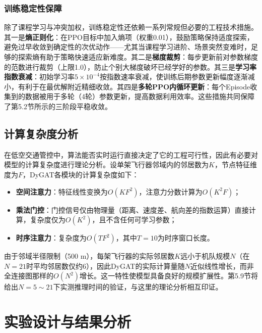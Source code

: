 \documentclass[12pt,a4paper,UTF8]{ctexart}
\begin{document}
\subsubsection{训练稳定性保障}

除了课程学习与冲突加权，训练稳定性还依赖一系列常规但必要的工程技术措施。其一是\textbf{熵正则化}：在PPO目标中加入熵项（权重0.01），鼓励策略保持适度探索，避免过早收敛到确定性的次优动作——尤其当课程学习进阶、场景突然变难时，足够的探索熵有助于策略快速适应新难度。其二是\textbf{梯度裁剪}：每步更新前对参数梯度的范数进行裁剪（上限1.0），防止个别大梯度破坏已经学好的参数。其三是\textbf{学习率指数衰减}：初始学习率$5\times10^{-4}$按指数速率衰减，使训练后期参数更新幅度逐渐减小，有利于在最优解附近精细收敛。其四是\textbf{多轮PPO内循环更新}：每个Episode收集到的数据被用于多轮（4轮）参数更新，提高数据利用效率。这些措施共同保障了第5.2节所示的三阶段平稳收敛。

\subsection{计算复杂度分析}

在低空交通管控中，算法能否实时运行直接决定了它的工程可行性，因此有必要对模型的计算复杂度进行理论分析。设单架飞行器邻域内的邻居数为$K$，节点特征维度为$F$，DyGAT各模块的计算复杂度如下：
\begin{itemize}
    \item \textbf{空间注意力}：特征线性变换为$O(KF^2)$，注意力分数计算为$O(K^2F)$；
    \item \textbf{乘法门控}：门控信号仅由物理量（距离、速度差、航向差的指数运算）直接计算，复杂度仅为$O(K^2)$，且不含任何可学习参数；
    \item \textbf{时序注意力}：复杂度为$O(TF^2)$，其中$T=10$为时序窗口长度。
\end{itemize}

由于邻域半径限制（500 m），每架飞行器的实际邻居数$K$远小于机队规模$N$（在$N=21$时平均邻居数仅约6），因此DyGAT的实际计算量随$N$近似线性增长，而非全连接图那样的$O(N^2)$增长。这一特性使模型具备良好的规模扩展性。第5.9节将给出$N=5\sim21$下实测推理时间的验证，与这里的理论分析相互印证。

\section{实验设计与结果分析}
\end{document}
